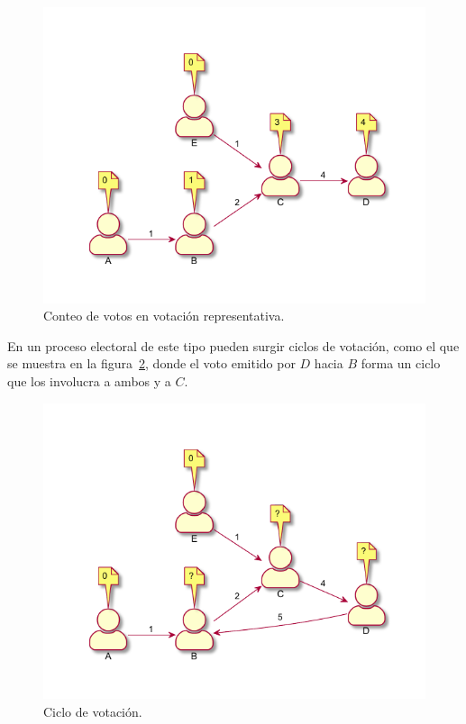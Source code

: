\begin{figure}[h!]
    \centering
    \includegraphics{Graphics/rep-voting.pdf}
    \caption{Conteo de votos en votación representativa.}
    \label{fig:r-voting}
\end{figure}



En un proceso electoral de este tipo pueden surgir ciclos de votación, como el que se muestra en la figura~\ref{fig:voting-cycle}, donde el voto emitido por $D$ hacia $B$ forma un ciclo que los involucra a ambos y a $C$.  

\begin{figure}[h!]
    \centering
    \includegraphics{Graphics/voting-cycle.pdf}
    \caption{Ciclo de votaci\'on.}
    \label{fig:voting-cycle}
\end{figure}


